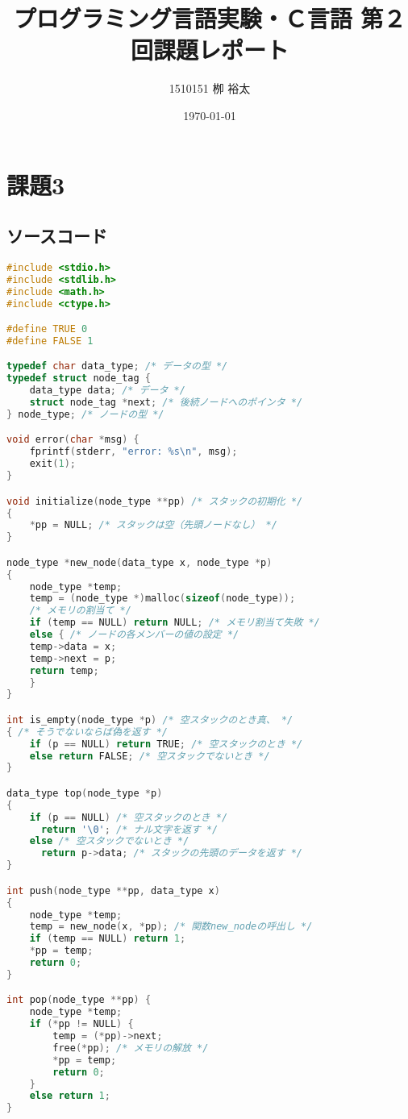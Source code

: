 \documentclass[11pt,a4paper, uplatex]{jsarticle}
\title{プログラミング言語実験・Ｃ言語 第２回課題レポート}
\author{1510151  栁 裕太}
\date{\today}
\begin{document}
\maketitle
%
%
\section{課題3}
\subsection{ソースコード}
\begin{lstlisting}[language=c]
#include <stdio.h>
#include <stdlib.h>
#include <math.h>
#include <ctype.h>

#define TRUE 0
#define FALSE 1

typedef char data_type; /* データの型 */
typedef struct node_tag {
    data_type data; /* データ */
    struct node_tag *next; /* 後続ノードへのポインタ */
} node_type; /* ノードの型 */

void error(char *msg) {
    fprintf(stderr, "error: %s\n", msg);
    exit(1);
}

void initialize(node_type **pp) /* スタックの初期化 */
{
    *pp = NULL; /* スタックは空（先頭ノードなし） */
}

node_type *new_node(data_type x, node_type *p)
{
    node_type *temp;
    temp = (node_type *)malloc(sizeof(node_type));
    /* メモリの割当て */
    if (temp == NULL) return NULL; /* メモリ割当て失敗 */
    else { /* ノードの各メンバーの値の設定 */
    temp->data = x;
    temp->next = p;
    return temp;
    }
}

int is_empty(node_type *p) /* 空スタックのとき真、 */
{ /* そうでないならば偽を返す */
    if (p == NULL) return TRUE; /* 空スタックのとき */
    else return FALSE; /* 空スタックでないとき */
}

data_type top(node_type *p)
{
    if (p == NULL) /* 空スタックのとき */
      return '\0'; /* ナル文字を返す */
    else /* 空スタックでないとき */
      return p->data; /* スタックの先頭のデータを返す */
}

int push(node_type **pp, data_type x)
{
    node_type *temp;
    temp = new_node(x, *pp); /* 関数new_nodeの呼出し */
    if (temp == NULL) return 1;
    *pp = temp;
    return 0;
}

int pop(node_type **pp) {
    node_type *temp;
    if (*pp != NULL) {
        temp = (*pp)->next;
        free(*pp); /* メモリの解放 */
        *pp = temp;
        return 0;
    }
    else return 1;
}



\end{lstlisting}
\end{document}
